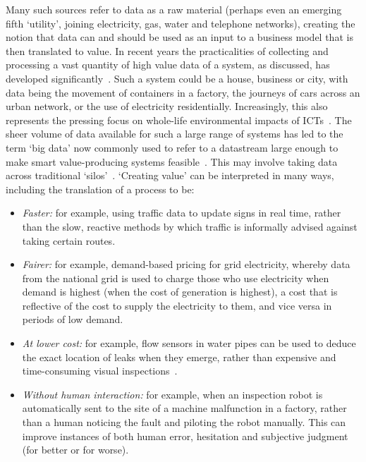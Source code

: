 \documentclass[journal]{IEEEtran}
\begin{document}
Many such sources refer to data as a raw material (perhaps even an
emerging fifth `utility', joining electricity, gas, water and
telephone networks), creating the notion that data can and should be
used as an input to a business model that is then translated to
value. In recent years the practicalities of collecting and processing
a vast quantity of high value data of a system, as discussed, has
developed significantly~\cite{arup-et-al:2011}. Such a system could be
a house, business or city, with data being the movement of containers
in a factory, the journeys of cars across an urban network, or the use
of electricity residentially. Increasingly, this also represents the
pressing focus on whole-life environmental impacts of
ICTs~\cite{cooper-et-al-gsict:2015}. The sheer volume of data
available for such a large range of systems has led to the term `big
data' now commonly used to refer to a datastream large enough to make
smart value-producing systems
feasible~\cite{hollands:2008,ibmsmartcities:2009,ciscoconcities:2010}. This
may involve taking data across traditional
`silos'~\cite{shapiro:2006,tsoukalas:2008}. `Creating value' can be
interpreted in many ways, including the translation of a process to
be:

\begin{itemize}
\item {\emph{Faster:}} for example, using traffic data to update
  signs in real time, rather than the slow, reactive methods by which
  traffic is informally advised against taking certain routes.
\item {\emph{Fairer:}} for example, demand-based pricing for grid
  electricity, whereby data from the national grid is used to charge
  those who use electricity when demand is highest (when the cost of
  generation is highest), a cost that is reflective of the cost to
  supply the electricity to them, and vice versa in periods of low
  demand.
\item {\emph{At lower cost:}} for example, flow sensors in water
  pipes can be used to deduce the exact location of leaks when they
  emerge, rather than expensive and time-consuming visual
  inspections~\cite{cosgrave-et-al:2014}.
\item {\emph{Without human interaction:}} for example, when an
  inspection robot is automatically sent to the site of a machine
  malfunction in a factory, rather than a human noticing the fault and
  piloting the robot manually. This can improve instances of both
  human error, hesitation and subjective judgment (for better or for
  worse).
\end{itemize}
\end{document}

